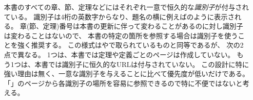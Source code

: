 \documentclass[index]{subfiles}
\begin{document}

本書のすべての章、節、定理などにはそれぞれ一意で恒久的な\emph{識別子}が付与されている。
識別子は4桁の英数字からなり、題名の横に例えばのように表示される。
章(節、定理)番号は本書の更新に伴って変わることがあるのに対し識別子は変わることはないので、
本書の特定の箇所を参照する場合は識別子を使うことを強く推奨する。
この様式はやで取られているものと同等であるが、
次の2点で異なる。
1つは、本書では定理や定義ごとのページは作成していない。
もう1つは、本書では識別子に恒久的なURLは付与されていない。
この設計に特に強い理由は無く、一意な識別子を与えることに比べて優先度が低いだけである。
「\myLinkNodeIndex{}」のページから各識別子の場所を容易に参照できるので特に不便ではないと考える。
\end{document}
